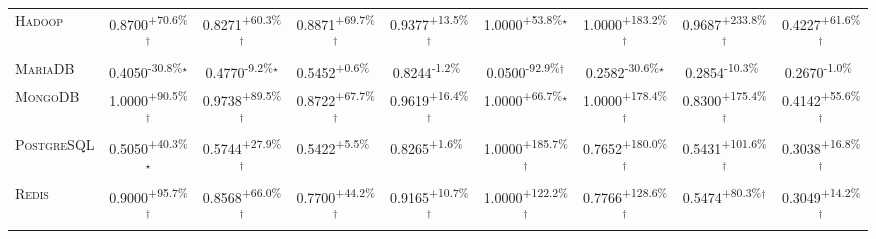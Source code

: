 \begin{table}[htbp]
\begin{tabular}{l|cccc|cccc}
\textsc{Hadoop} & \cellcolor{green!30}0.8700\textsuperscript{+70.6\%}$^\dagger$ & \cellcolor{green!30}0.8271\textsuperscript{+60.3\%}$^\dagger$ & \cellcolor{green!30}0.8871\textsuperscript{+69.7\%}$^\dagger$ & \cellcolor{green!30}0.9377\textsuperscript{+13.5\%}$^\dagger$ & \cellcolor{green!30}1.0000\textsuperscript{+53.8\%}$^\star$ & \cellcolor{green!30}1.0000\textsuperscript{+183.2\%}$^\dagger$ & \cellcolor{green!30}0.9687\textsuperscript{+233.8\%}$^\dagger$ & \cellcolor{green!30}0.4227\textsuperscript{+61.6\%}$^\dagger$ \\
\textsc{MariaDB} & \cellcolor{red!30}0.4050\textsuperscript{-30.8\%}$^\star$ & \cellcolor{red!30}0.4770\textsuperscript{-9.2\%}$^\star$ & \cellcolor{green!30}0.5452\textsuperscript{+0.6\%}$^{\,\,\,}$ & \cellcolor{red!30}0.8244\textsuperscript{-1.2\%}$^{\,\,\,}$ & \cellcolor{red!30}0.0500\textsuperscript{-92.9\%}$^\dagger$ & \cellcolor{red!30}0.2582\textsuperscript{-30.6\%}$^\star$ & \cellcolor{red!30}0.2854\textsuperscript{-10.3\%}$^{\,\,\,}$ & \cellcolor{red!30}0.2670\textsuperscript{-1.0\%}$^{\,\,\,}$ \\
\textsc{MongoDB} & \cellcolor{green!30}1.0000\textsuperscript{+90.5\%}$^\dagger$ & \cellcolor{green!30}0.9738\textsuperscript{+89.5\%}$^\dagger$ & \cellcolor{green!30}0.8722\textsuperscript{+67.7\%}$^\dagger$ & \cellcolor{green!30}0.9619\textsuperscript{+16.4\%}$^\dagger$ & \cellcolor{green!30}1.0000\textsuperscript{+66.7\%}$^\star$ & \cellcolor{green!30}1.0000\textsuperscript{+178.4\%}$^\dagger$ & \cellcolor{green!30}0.8300\textsuperscript{+175.4\%}$^\dagger$ & \cellcolor{green!30}0.4142\textsuperscript{+55.6\%}$^\dagger$ \\
\textsc{PostgreSQL} & \cellcolor{green!30}0.5050\textsuperscript{+40.3\%}$^\star$ & \cellcolor{green!30}0.5744\textsuperscript{+27.9\%}$^\dagger$ & \cellcolor{green!30}0.5422\textsuperscript{+5.5\%}$^{\,\,\,}$ & \cellcolor{green!30}0.8265\textsuperscript{+1.6\%}$^{\,\,\,}$ & \cellcolor{green!30}1.0000\textsuperscript{+185.7\%}$^\dagger$ & \cellcolor{green!30}0.7652\textsuperscript{+180.0\%}$^\dagger$ & \cellcolor{green!30}0.5431\textsuperscript{+101.6\%}$^\dagger$ & \cellcolor{green!30}0.3038\textsuperscript{+16.8\%}$^\dagger$ \\
\textsc{Redis} & \cellcolor{green!30}0.9000\textsuperscript{+95.7\%}$^\dagger$ & \cellcolor{green!30}0.8568\textsuperscript{+66.0\%}$^\dagger$ & \cellcolor{green!30}0.7700\textsuperscript{+44.2\%}$^\dagger$ & \cellcolor{green!30}0.9165\textsuperscript{+10.7\%}$^\dagger$ & \cellcolor{green!30}1.0000\textsuperscript{+122.2\%}$^\dagger$ & \cellcolor{green!30}0.7766\textsuperscript{+128.6\%}$^\dagger$ & \cellcolor{green!30}0.5474\textsuperscript{+80.3\%}$^\dagger$ & \cellcolor{green!30}0.3049\textsuperscript{+14.2\%}$^\dagger$ \\

\end{tabular}
\end{table}
